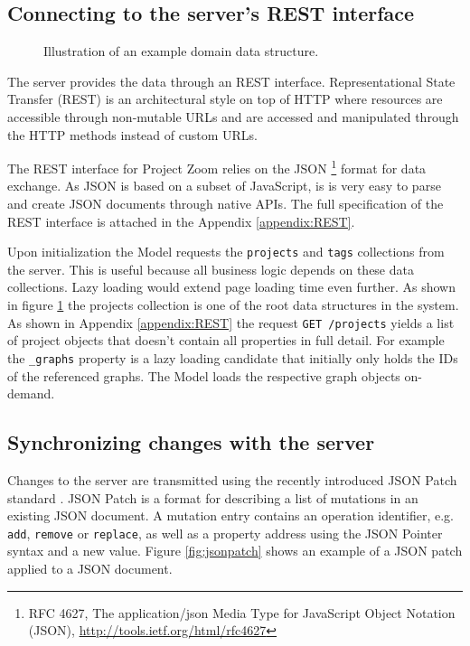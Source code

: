 \subsection{Connecting to the server's REST interface}

\begin{figure}
\caption{Illustration of an example domain data structure.}
\label{fig:projectstruc}
\end{figure}

The server provides the data through an REST interface. Representational State Transfer (REST) is an architectural style on top of HTTP where resources are accessible through non-mutable URLs and are accessed and manipulated through the HTTP methods instead of custom URLs. \cite{Fielding_2000} 

The REST interface for Project Zoom relies on the JSON \footnote{RFC 4627,  The application/json Media Type for JavaScript Object Notation (JSON), \url{http://tools.ietf.org/html/rfc4627}} format for data exchange. As JSON is based on a subset of JavaScript, is is very easy to parse and create JSON documents through native APIs. The full specification of the REST interface is attached in the Appendix  \ref{appendix:REST}.

Upon initialization the Model requests the \texttt{projects} and \texttt{tags} collections from the server. This is useful because all business logic depends on these data collections. Lazy loading would extend page loading time even further. As shown in figure \ref{fig:projectstruc} the projects collection is one of the root data structures in the system. As shown in Appendix \ref{appendix:REST} the request \texttt{GET /projects} yields a list of project objects that doesn't contain all properties in full detail. For example the \texttt{\_graphs} property is a lazy loading candidate that initially only holds the IDs of the referenced graphs. The Model loads the respective graph objects on-demand.


\subsection{Synchronizing changes with the server}

Changes to the server are transmitted using the recently introduced JSON Patch standard \cite{RFC6902}. JSON Patch is a format for describing a list of mutations in an existing JSON document. A mutation entry contains an operation identifier, e.g. \texttt{add}, \texttt{remove} or \texttt{replace}, as well as a property address using the JSON Pointer syntax and a new value. Figure \ref{fig:jsonpatch} shows an example of a JSON patch applied to a JSON document.

